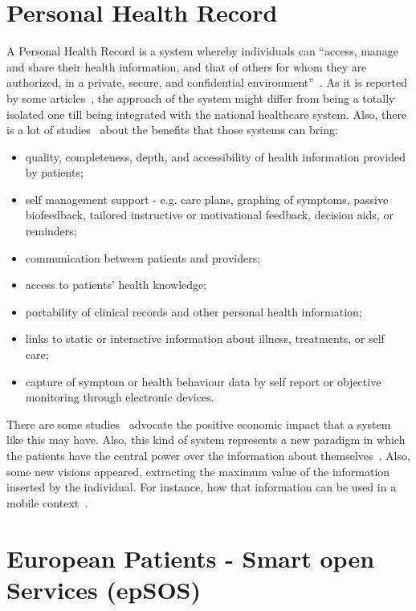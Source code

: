 \section{Personal Health Record}\label{sec:phr}

A Personal Health Record is a system whereby individuals can ``access, manage and share their health information, and that of others for whom they are authorized, in a private, secure, and confidential environment''~\citep{Health2003}. As it is reported by some articles~\citep{Tang2006,Tang2009}, the approach of the system might differ from being a totally isolated one till being integrated with the national healthcare system. Also, there is a lot of studies~\cite{Tang2009,Pagliari2007,Detmer2008, Fricton2008} about the benefits that those systems can bring:
\begin{itemize}
\item quality, completeness, depth, and accessibility of health information provided by patients;
\item self management support - e.g. care plans, graphing of symptoms, passive biofeedback, tailored instructive or motivational feedback, decision aids, or reminders;
\item communication between patients and providers;
\item access to patients' health knowledge;
\item portability of clinical records and other personal health information;
\item links to static or interactive information about illness, treatments, or self care;
\item capture of symptom or health behaviour data by self report or objective monitoring through electronic devices.
\end{itemize}

There are some studies~\cite{Kaelber2008,Gearon2007} advocate the positive economic impact that a system like this may have. Also, this kind of system represents a new paradigm in which the patients have the central power over the information about themselves~\citep{Ball2007}. Also, some new visions appeared, extracting the maximum value of the information inserted by the individual. For instance, how that information can be used in a mobile context~\citep{Brief2010}.






\section{European Patients - Smart open Services (epSOS)} \label{sec:epsos}

